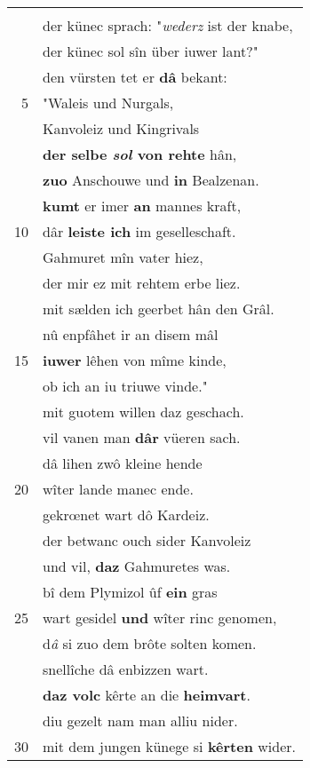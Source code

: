 \documentclass[8pt,a4paper,notitlepage]{article}
\begin{document}
\begin{table}[ht]
\begin{minipage}[t]{0.5\linewidth}
\begin{tabular}{rl}
 & \textbf{\begin{large}M\end{large}an nam des gezeltes winden} abe.\\ 
 & der künec sprach: "\textit{wederz} ist der knabe,\\ 
 & der künec sol sîn über iuwer lant?"\\ 
 & den vürsten tet er \textbf{dâ} bekant:\\ 
5 & "Waleis und Nurgals,\\ 
 & Kanvoleiz und Kingrivals\\ 
 & \textbf{der selbe \textit{sol} von rehte} hân,\\ 
 & \textbf{zuo} Anschouwe und \textbf{in} Bealzenan.\\ 
 & \textbf{kumt} er imer \textbf{an} mannes kraft,\\ 
10 & dâr \textbf{leiste ich} im geselleschaft.\\ 
 & Gahmuret mîn vater hiez,\\ 
 & der mir ez mit rehtem erbe liez.\\ 
 & mit sælden ich geerbet hân den Grâl.\\ 
 & nû enpfâhet ir an disem mâl\\ 
15 & \textbf{iuwer} lêhen von mîme kinde,\\ 
 & ob ich an iu triuwe vinde."\\ 
 & mit guotem willen daz geschach.\\ 
 & vil vanen man \textbf{dâr} vüeren sach.\\ 
 & dâ lihen zwô kleine hende\\ 
20 & wîter lande manec ende.\\ 
 & gekrœnet wart dô Kardeiz.\\ 
 & der betwanc ouch sider Kanvoleiz\\ 
 & und vil, \textbf{daz} Gahmuretes was.\\ 
 & bî dem Plymizol ûf \textbf{ein} gras\\ 
25 & wart gesidel \textbf{und} wîter rinc genomen,\\ 
 & d\textit{â} si zuo dem brôte solten komen.\\ 
 & snellîche dâ enbizzen wart.\\ 
 & \textbf{daz volc} kêrte an die \textbf{heimvart}.\\ 
 & diu gezelt nam man alliu nider.\\ 
30 & mit dem jungen künege si \textbf{kêrten} wider.\\ 
\end{tabular}

\end{minipage}
\end{table}
\end{document}
